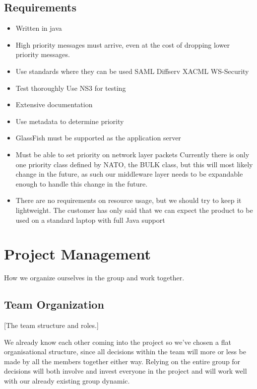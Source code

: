 \documentclass[12pt]{article}
\begin{document}
    \subsection{Requirements}\label{taskreq}
    \begin{itemize}
        \item Written in java
        \item High priority messages must arrive, even at the cost of dropping lower priority messages.
        \item Use standards where they can be used
            \subitem SAML
            \subitem Diffserv
            \subitem XACML
            \subitem WS-Security
        \item Test thoroughly
            \subitem Use NS3 for testing
        \item Extensive documentation
        \item Use metadata to determine priority
        \item GlassFish must be supported as the application server
        \item Must be able to set priority on network layer packets
            \subitem Currently there is only one priority class defined by NATO, the BULK class, but this will most likely change in the future, as such our middleware layer needs to be expandable enough to handle this change in the future.
        \item There are no requirements on resource usage, but we should try to keep it lightweight.
            \subitem The customer has only said that we can expect the product to be used on a standard laptop with full Java support
    \end{itemize}
\section{Project Management}\label{management} How we organize ourselves in the group and work together. 
    \subsection{Team Organization}\label{team} [The team structure and roles.]
    
    We already know each other coming into the project so we’ve chosen a flat organisational structure, since all decisions within the team will more or less be made by all the members together either way. Relying on the entire group for decisions will both involve and invest everyone in the project and will work well with our already existing group dynamic.
\end{document}
